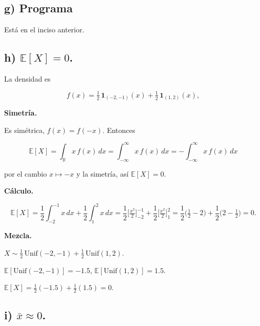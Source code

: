 \documentclass[10pt,a4paper]{article}
\begin{document}
    \begin{center}
    \end{center}
    { \hspace*{\fill} \\}
    
    \hypertarget{g-programa}{%
\subsection{g) Programa}\label{g-programa}}

    Está en el inciso anterior.

    \hypertarget{h-mathbbex-0.}{%
\subsection{\texorpdfstring{h)
\(\mathbb{E}[X] = 0\).}{h) \textbackslash mathbb\{E\}{[}X{]} = 0.}}\label{h-mathbbex-0.}}

    La densidad es

\[
f(x)=\tfrac12\,\mathbf 1_{(-2,-1)}(x)+\tfrac12\,\mathbf 1_{(1,2)}(x),
\]

\textbf{Simetría.}

Es simétrica, \(f(x)=f(-x)\). Entonces

\[
\mathbb E[X]=\int_{\mathbb R} x\,f(x)\,dx
=\int_{-\infty}^{\infty} x\,f(x)\,dx
=-\int_{-\infty}^{\infty} x\,f(x)\,dx
\]

por el cambio \(x\mapsto -x\) y la simetría, así \(\mathbb E[X]=0\).

\textbf{Cálculo.}

\[
\mathbb E[X]=\frac12\!\int_{-2}^{-1}\!x\,dx+\frac12\!\int_{1}^{2}\!x\,dx
=\frac12\Big[\tfrac{x^{2}}{2}\Big]_{-2}^{-1}+\frac12\Big[\tfrac{x^{2}}{2}\Big]_{1}^{2}
=\frac12\Big(\tfrac12-2\Big)+\frac12\Big(2-\tfrac12\Big)=0.
\]

\textbf{Mezcla.}

\(X\sim \tfrac12\,\mathrm{Unif}(-2,-1)+\tfrac12\,\mathrm{Unif}(1,2)\).

\(\mathbb E[\mathrm{Unif}(-2,-1)]=-1.5\),
\(\mathbb E[\mathrm{Unif}(1,2)]=1.5\).

\(\mathbb E[X]=\tfrac12(-1.5)+\tfrac12(1.5)=0\).

    \hypertarget{i-barx-approx-0.}{%
\subsection{\texorpdfstring{i)
\(\bar{x} \approx 0\).}{i) \textbackslash bar\{x\} \textbackslash approx 0.}}\label{i-barx-approx-0.}}
\end{document}
